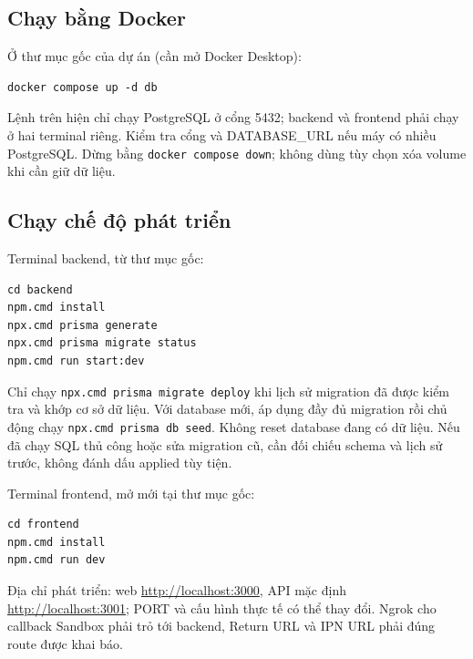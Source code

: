 \documentclass[a4paper]{article}
\begin{document}
\subsection{Chạy bằng Docker}
Ở thư mục gốc của dự án (cần mở Docker Desktop):
\begin{lstlisting}[style=brew,language={}]
docker compose up -d db
\end{lstlisting}
Lệnh trên hiện chỉ chạy PostgreSQL ở cổng 5432; backend và frontend phải chạy ở hai terminal riêng. Kiểm tra cổng và DATABASE\_URL nếu máy có nhiều PostgreSQL. Dừng bằng \texttt{docker compose down}; không dùng tùy chọn xóa volume khi cần giữ dữ liệu.

\subsection{Chạy chế độ phát triển}
Terminal backend, từ thư mục gốc:
\begin{lstlisting}[style=brew,language={}]
cd backend
npm.cmd install
npx.cmd prisma generate
npx.cmd prisma migrate status
npm.cmd run start:dev
\end{lstlisting}
Chỉ chạy \texttt{npx.cmd prisma migrate deploy} khi lịch sử migration đã được kiểm tra và khớp cơ sở dữ liệu. Với database mới, áp dụng đầy đủ migration rồi chủ động chạy \texttt{npx.cmd prisma db seed}. Không reset database đang có dữ liệu. Nếu đã chạy SQL thủ công hoặc sửa migration cũ, cần đối chiếu schema và lịch sử trước, không đánh dấu applied tùy tiện.

Terminal frontend, mở mới tại thư mục gốc:
\begin{lstlisting}[style=brew,language={}]
cd frontend
npm.cmd install
npm.cmd run dev
\end{lstlisting}
Địa chỉ phát triển: web \url{http://localhost:3000}, API mặc định \url{http://localhost:3001}; PORT và cấu hình thực tế có thể thay đổi. Ngrok cho callback Sandbox phải trỏ tới backend, Return URL và IPN URL phải đúng route được khai báo.
\end{document}
